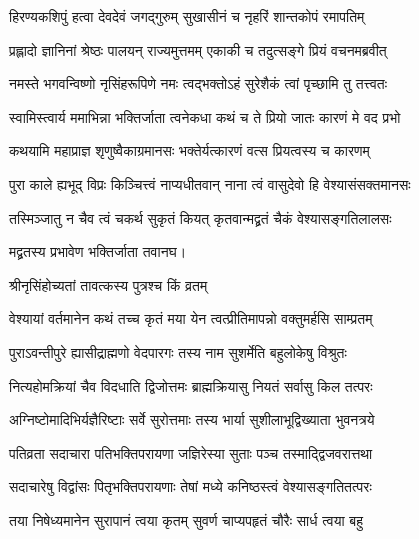 

\twolineshloka
{हिरण्यकशिपुं हत्वा देवदेवं जगद्गुरुम्}
{सुखासीनं च नृहरिं शान्तकोपं रमापतिम्} %

\twolineshloka
{प्रह्लादो ज्ञानिनां श्रेष्ठः पालयन् राज्यमुत्तमम्}
{एकाकी च तदुत्सङ्गे प्रियं वचनमब्रवीत्} %


\twolineshloka
{नमस्ते भगवन्विष्णो नृसिंहरूपिणे नमः}
{त्वद्भक्तोऽहं सुरेशैकं त्वां पृच्छामि तु तत्त्वतः} %

\twolineshloka
{स्वामिस्त्वार्य ममाभिन्ना भक्तिर्जाता त्वनेकधा}
{कथं च ते प्रियो जातः कारणं मे वद प्रभो} %


\twolineshloka
{कथयामि महाप्राज्ञ शृणुष्वैकाग्रमानसः}
{भक्तेर्यत्कारणं वत्स प्रियत्वस्य च कारणम्} %

\twolineshloka
{पुरा काले ह्यभूद् विप्रः किञ्चित्त्वं नाप्यधीतवान्}
{नाना त्वं वासुदेवो हि वेश्यासंसक्तमानसः} %


\twolineshloka
{तस्मिञ्जातु न चैव त्वं चकर्थ सुकृतं कियत्}
{कृतवान्मद्व्रतं चैकं वेश्यासङ्गतिलालसः} %


{मद्व्रतस्य प्रभावेण भक्तिर्जाता तवानघ।}


\onelineshloka
{श्रीनृसिंहोच्यतां तावत्कस्य पुत्रश्च किं व्रतम्} %

\twolineshloka
{वेश्यायां वर्तमानेन कथं तच्च कृतं मया}
{येन त्वत्प्रीतिमापन्नो वक्तुमर्हसि साम्प्रतम्} %


\twolineshloka
{पुराऽवन्तीपुरे ह्यासीद्राह्मणो वेदपारगः}
{तस्य नाम सुशर्मेति बहुलोकेषु विश्रुतः} %

\twolineshloka
{नित्यहोमक्रियां चैव विदधाति द्विजोत्तमः}
{ब्राह्मक्रियासु नियतं सर्वासु किल तत्परः} %

\twolineshloka
{अग्निष्टोमादिभिर्यज्ञैरिष्टाः सर्वे सुरोत्तमाः}
{तस्य भार्या सुशीलाभूद्विख्याता भुवनत्रये} %

\twolineshloka
{पतिव्रता सदाचारा पतिभक्तिपरायणा}
{जज्ञिरेस्या सुताः पञ्च तस्माद्द्विजवरात्तथा} %

\twolineshloka
{सदाचारेषु विद्वांसः पितृभक्तिपरायणाः}
{तेषां मध्ये कनिष्ठस्त्वं वेश्यासङ्गतितत्परः} %

\twolineshloka
{तया निषेध्यमानेन सुरापानं त्वया कृतम्}
{सुवर्ण चाप्यपहृतं चौरैः सार्ध त्वया बहु} %

